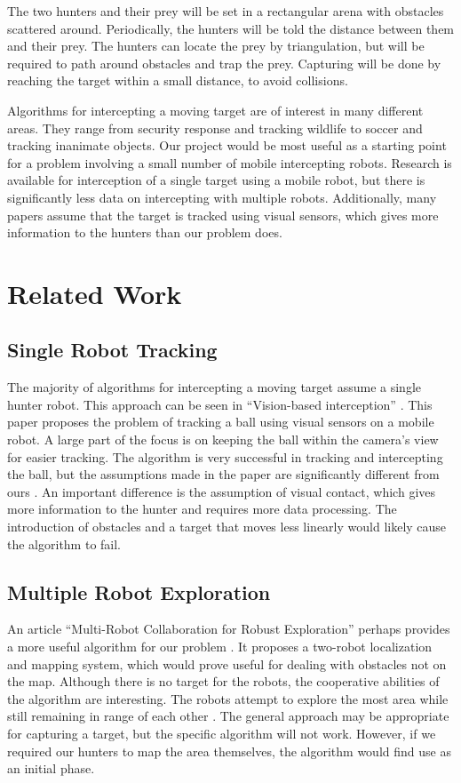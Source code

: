\documentclass[conference]{IEEEtran}
\begin{document}
The two hunters and their prey will be set in a rectangular arena with obstacles scattered around.
Periodically, the hunters will be told the distance between them and their prey.
The hunters can locate the prey by triangulation, but will be required to path around obstacles and trap the prey.
Capturing will be done by reaching the target within a small distance, to avoid collisions.

Algorithms for intercepting a moving target are of interest in many different areas.
They range from security response and tracking wildlife to soccer and tracking inanimate objects.
Our project would be most useful as a starting point for a problem involving a small number of mobile intercepting robots.
Research is available for interception of a single target using a mobile robot, but there is significantly less data on intercepting with multiple robots.
Additionally, many papers assume that the target is tracked using visual sensors, which gives more information to the hunters than our problem does.

\section{Related Work}

\subsection{Single Robot Tracking}
The majority of algorithms for intercepting a moving target assume a single hunter robot.
This approach can be seen in ``Vision-based interception'' \cite{freda}.
This paper proposes the problem of tracking a ball using visual sensors on a mobile robot.
A large part of the focus is on keeping the ball within the camera's view for easier tracking.
The algorithm is very successful in tracking and intercepting the ball, but the assumptions made in the paper are significantly different from ours \cite{freda}.
An important difference is the assumption of visual contact, which gives more information to the hunter and requires more data processing.
The introduction of obstacles and a target that moves less linearly would likely cause the algorithm to fail.

\subsection{Multiple Robot Exploration}
An article ``Multi-Robot Collaboration for Robust Exploration'' perhaps provides a more useful algorithm for our problem \cite{rekleitis}.
It proposes a two-robot localization and mapping system, which would prove useful for dealing with obstacles not on the map.
Although there is no target for the robots, the cooperative abilities of the algorithm are interesting.
The robots attempt to explore the most area while still remaining in range of each other \cite{rekleitis}.
The general approach may be appropriate for capturing a target, but the specific algorithm will not work.
However, if we required our hunters to map the area themselves, the algorithm would find use as an initial phase.
\end{document}
